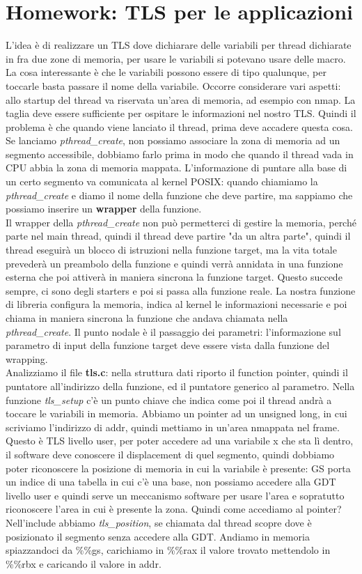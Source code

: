 \documentclass[12pt, oneside]{extbook}
\begin{document}
\section*{Homework: TLS per le applicazioni}
L'idea è di realizzare un TLS dove dichiarare delle variabili per thread dichiarate in fra due zone di memoria, per usare le variabili si potevano usare delle macro. La cosa interessante è che le variabili possono essere di tipo qualunque, per toccarle basta passare il nome della variabile. Occorre considerare vari aspetti: allo startup del thread va riservata un'area di memoria, ad esempio con nmap. La taglia deve essere sufficiente per ospitare le informazioni nel nostro TLS. Quindi il problema è che quando viene lanciato il thread, prima deve accadere questa cosa. Se lanciamo \textit{pthread\_create}, non possiamo associare la zona di memoria ad un segmento accessibile, dobbiamo farlo prima in modo che quando il thread vada in CPU abbia la zona di memoria mappata. L'informazione di puntare alla base di un certo segmento va comunicata al kernel POSIX: quando chiamiamo la \textit{pthread\_create} e diamo il nome della funzione che deve partire, ma sappiamo che possiamo inserire un \textbf{wrapper} della funzione.\\ Il wrapper della \textit{pthread\_create} non può permetterci di gestire la memoria, perché parte nel main thread, quindi il thread deve partire "da un altra parte", quindi il thread eseguirà un blocco di istruzioni nella funzione target, ma la vita totale prevederà un preambolo della funzione e quindi verrà annidata in una funzione esterna che poi attiverà in maniera sincrona la funzione target. Questo succede sempre, ci sono degli starters e poi si passa alla funzione reale. La nostra funzione di libreria configura la memoria, indica al kernel le informazioni necessarie e poi chiama in maniera sincrona la funzione che andava chiamata nella \textit{pthread\_create}. Il punto nodale è il passaggio dei parametri: l'informazione sul parametro di input della funzione target deve essere vista dalla funzione del wrapping.\\Analizziamo il file \textbf{tls.c}: nella struttura dati riporto il function pointer, quindi il puntatore all'indirizzo della funzione, ed il puntatore generico al parametro. Nella funzione \textit{tls\_setup} c'è un punto chiave che indica come poi il thread andrà a toccare le variabili in memoria. Abbiamo un pointer ad un unsigned long, in cui scriviamo l'indirizzo di addr, quindi mettiamo in un'area nmappata nel frame. Questo è TLS livello user, per poter accedere ad una variabile x che sta lì dentro, il software deve conoscere il displacement di quel segmento, quindi dobbiamo poter riconoscere la posizione di memoria in cui la variabile è presente: GS porta un indice di una tabella in cui c'è una base, non possiamo accedere alla GDT livello user e quindi serve un meccanismo software per usare l'area e sopratutto riconoscere l'area in cui è presente la zona. Quindi come accediamo al pointer? Nell'include abbiamo \textit{tls\_position}, se chiamata dal thread scopre dove è posizionato il segmento senza accedere alla GDT. Andiamo in memoria spiazzandoci da \%\%gs, carichiamo in \%\%rax il valore trovato mettendolo in \%\%rbx e caricando il valore in addr.
\end{document}

